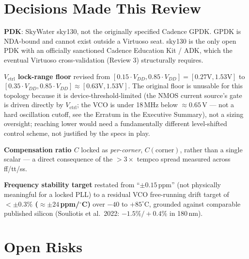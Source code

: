 \documentclass[11pt]{article}
\begin{document}
\section{Decisions Made This Review}
\label{sec:decisions}

\begin{decision}
\textbf{PDK}: SkyWater sky130, not the originally specified Cadence GPDK. GPDK is NDA-bound and cannot exist outside a Virtuoso seat. sky130 is the only open PDK with an officially sanctioned Cadence Education Kit / ADK, which the eventual Virtuoso cross-validation (Review 3) structurally requires.
\end{decision}

\begin{decision}
\textbf{$V_{\text{ctrl}}$ lock-range floor} revised from $[0.15\cdot V_{DD}, 0.85\cdot V_{DD}] = [0.27\text{V}, 1.53\text{V}]$ to $[0.35\cdot V_{DD}, 0.85\cdot V_{DD}] \approx [0.63\text{V}, 1.53\text{V}]$. The original floor is unusable for this topology because it is device-threshold-limited (the NMOS current source's gate is driven directly by $V_{\text{ctrl}}$; the VCO is under 18\,MHz below $\approx 0.65$\,V --- not a hard oscillation cutoff, see the Erratum in the Executive Summary), not a sizing oversight; reaching lower would need a fundamentally different level-shifted control scheme, not justified by the specs in play.
\end{decision}

\begin{decision}
\textbf{Compensation ratio $C$} locked as \emph{per-corner}, $C(\text{corner})$, rather than a single scalar --- a direct consequence of the $>3\times$ tempco spread measured across ff/tt/ss.
\end{decision}

\begin{decision}
\textbf{Frequency stability target} restated from ``$\pm0.15$\,ppm'' (not physically meaningful for a locked PLL) to a residual VCO free-running drift target of \textbf{$<\pm0.3\%$ ($\approx\pm24$\,ppm/$^\circ$C)} over $-40$ to $+85^\circ$C, grounded against comparable published silicon (Souliotis et al.\ 2022: $-1.5\%/+0.4\%$ in 180\,nm).
\end{decision}

\section{Open Risks}
\label{sec:risks}
\end{document}
